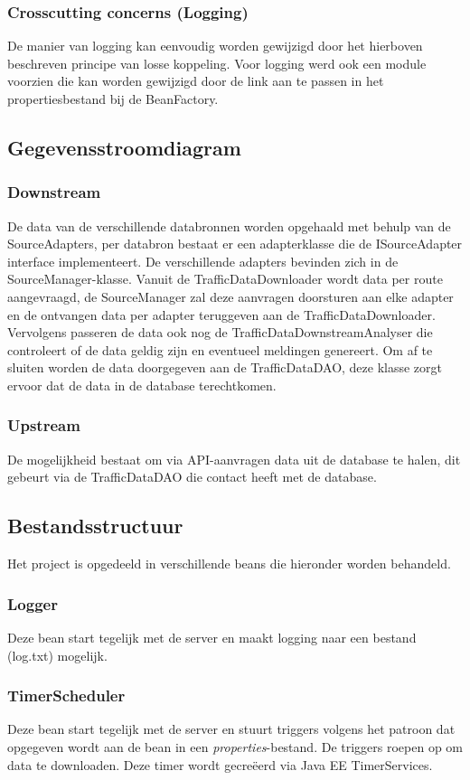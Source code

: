 \documentclass[ps,a4paper,oneside]{report}
\begin{document}
\subsubsection{Crosscutting concerns (Logging)}
De manier van logging kan eenvoudig worden gewijzigd door het hierboven beschreven principe van losse koppeling. Voor logging werd ook een module voorzien die kan worden gewijzigd door de link aan te passen in het propertiesbestand bij de BeanFactory.
\clearpage
\subsection{Gegevensstroomdiagram}
\subsubsection{Downstream}
De data van de verschillende databronnen worden opgehaald met behulp van de SourceAdapters, per databron bestaat er een adapterklasse die de ISourceAdapter interface implementeert. De verschillende adapters bevinden zich in de \\SourceManager-klasse. Vanuit de TrafficDataDownloader wordt data per route aangevraagd, de SourceManager zal deze aanvragen doorsturen aan elke adapter en de ontvangen data per adapter teruggeven aan de TrafficDataDownloader. Vervolgens passeren de data ook nog de TrafficDataDownstreamAnalyser die controleert of de data geldig zijn en eventueel meldingen genereert. Om af te sluiten worden de data doorgegeven aan de TrafficDataDAO, deze klasse zorgt ervoor dat de data in de database terechtkomen. 
\subsubsection{Upstream}
De mogelijkheid bestaat om via API-aanvragen data uit de database te halen, dit gebeurt via de TrafficDataDAO die contact heeft met de database.
\clearpage
\subsection{Bestandsstructuur}
Het project is opgedeeld in verschillende beans die hieronder worden behandeld.
\subsubsection{Logger}
Deze bean start tegelijk met de server en maakt logging naar een bestand (log.txt) mogelijk.
\subsubsection{TimerScheduler}
Deze bean start tegelijk met de server en stuurt triggers volgens het patroon dat opgegeven wordt aan de bean in een \textit{properties}-bestand. De triggers roepen op om data te downloaden. Deze timer wordt gecre\"eerd via Java EE TimerServices.
\end{document}
